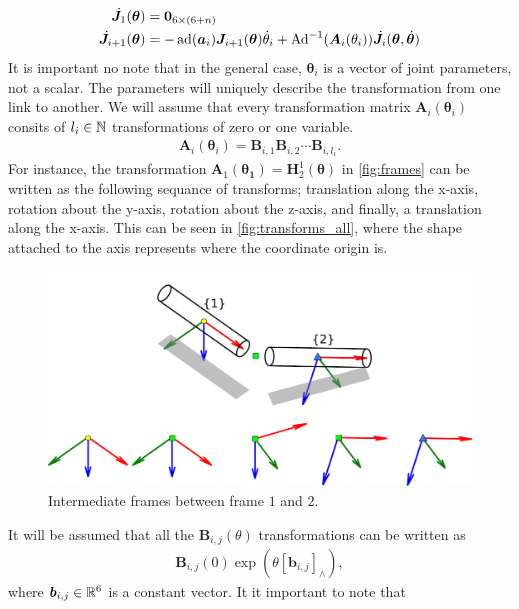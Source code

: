 \begin{align}
    \dot{\bm{J}}_1(\bm{\theta}) &= \bm{0}_{6\times(6+n)} \\
    \dot{\bm{J}}_{i+1}(\bm{\theta}) &= -\operatorname{ad}(\bm{a}_i)\bm{J}_{i+1}(\bm{\theta})\dot{\theta}_i +
        \operatorname{Ad}^{-1}(\bm{A}_i(\theta_i))\dot{\bm{J}}_i(\bm{\theta},\dot{\bm{\theta}})
\end{align}
It is important no note that in the general case, $\bm{\theta}_i$ is a vector of
joint parameters, not a scalar. The parameters will uniquely describe the transformation from one link
to another. We will assume that every transformation matrix $\bm{A}_i(\bm{\theta}_i)$ consits of $l_i \in \mathbb{N}$ transformations
of zero or one variable.
\begin{align}
    \bm{A}_i(\bm{\theta}_i) = \bm{B}_{i,1} \bm{B}_{i,2} \cdots \bm{B}_{i,l_i}.
\end{align}
For instance, the transformation $\bm{A}_1(\bm{\bm{\theta}_1}) = \bm{H}_2^1(\bm{\theta})$
in \autoref{fig:frames} can be written as the following sequance of transforms;
translation along the x-axis, rotation about the y-axis, rotation about the z-axis, and finally,
a translation along the x-axis. This can be seen in \autoref{fig:transforms_all}, where the shape
attached to the axis represents where the coordinate origin is.
\begin{figure}[h!]
    \centering
    \includegraphics[width=\textwidth]{assets/transforms_all.pdf}
    \caption{Intermediate frames between frame $1$ and $2$.}
    \label{fig:transforms_all}
\end{figure}
It will be assumed that all the $\bm{B}_{i,j}(\theta)$ transformations can be written as
\begin{align}
    \bm{B}_{i,j}(0)\exp\left(\theta[\bm{b}_{i,j}]_{\wedge}\right),
\end{align}
where $\bm{b}_{i,j} \in \mathbb{R}^6$ is a constant vector. It it important to note that
